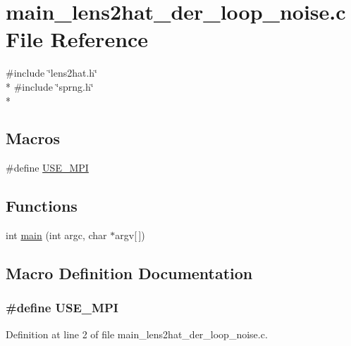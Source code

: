 \section{main\-\_\-lens2hat\-\_\-der\-\_\-loop\-\_\-noise.\-c File Reference}
\label{main__lens2hat__der__loop__noise_8c}
{\ttfamily \#include \char`\"{}lens2hat.\-h\char`\"{}}\\*
{\ttfamily \#include \char`\"{}sprng.\-h\char`\"{}}\\*
\subsection*{Macros}
\begin{DoxyCompactItemize}
\item 
\#define \hyperlink{main__lens2hat__der__loop__noise_8c_a3869d282031f6ea6b50fdb980b758420}{U\-S\-E\-\_\-\-M\-P\-I}
\end{DoxyCompactItemize}
\subsection*{Functions}
\begin{DoxyCompactItemize}
\item 
int \hyperlink{main__lens2hat__der__loop__noise_8c_a0ddf1224851353fc92bfbff6f499fa97}{main} (int argc, char $\ast$argv\mbox{[}$\,$\mbox{]})
\end{DoxyCompactItemize}


\subsection{Macro Definition Documentation}
\subsubsection[{U\-S\-E\-\_\-\-M\-P\-I}]{\setlength{\rightskip}{0pt plus 5cm}\#define U\-S\-E\-\_\-\-M\-P\-I}\label{main__lens2hat__der__loop__noise_8c_a3869d282031f6ea6b50fdb980b758420}


Definition at line 2 of file main\-\_\-lens2hat\-\_\-der\-\_\-loop\-\_\-noise.\-c.



